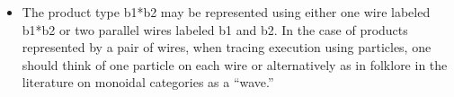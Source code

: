 \documentclass{llncs}
\begin{document}
\begin{itemize}
\item The product type {{b1*b2}} may be represented using either one wire
  labeled {{b1*b2}} or two parallel wires labeled {{b1}} and {{b2}}. In the
  case of products represented by a pair of wires, when tracing execution
  using particles, one should think of one particle on each wire or
  alternatively as in folklore in the literature on monoidal categories as a
  ``wave.''
\begin{multicols}{4}
\begin{center}
\end{center}
\columnbreak
\begin{center}
\end{center}
\begin{center}
\end{center}
\begin{center}
\end{center}
\end{multicols}


\end{itemize}
\end{document}
